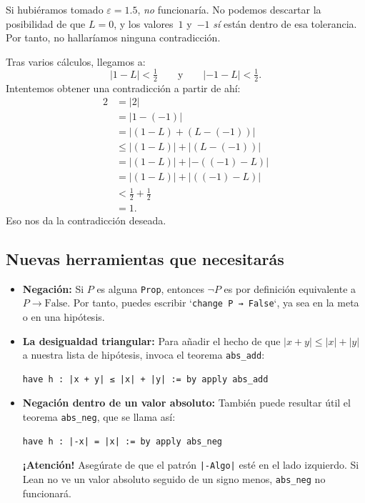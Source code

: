 \begin{nota}
  Si hubiéramos tomado $\varepsilon = 1.5$, \emph{no} funcionaría. No podemos
  descartar la posibilidad de que $L = 0$, y los valores~$1$ y~$-1$ \emph{sí}
  están dentro de esa tolerancia. Por tanto, no hallaríamos ninguna
  contradicción.
\end{nota}

Tras varios cálculos, llegamos a:
\[
  |1 - L| < \tfrac{1}{2}
  \qquad\text{y}\qquad
  |-1 - L| < \tfrac{1}{2}.
\]
Intentemos obtener una contradicción a partir de ahí:
\begin{align*}
  2 &= |2| \\
    &= |1 - (-1)| \\
    &= |(1 - L) + (L - (-1))| \\
    &\leq |(1 - L)| + |(L - (-1))| \\
    &= |(1 - L)| + |{-}((-1) - L)| \\
    &= |(1 - L)| + |((-1) - L)| \\
    & < \tfrac{1}{2} + \tfrac{1}{2} \\
    &= 1.
\end{align*}
Eso nos da la contradicción deseada.

\subsection*{Nuevas herramientas que necesitarás}

\begin{itemize}
  \item \textbf{Negación:} Si $P$ es alguna \texttt{Prop}, entonces $\neg P$
        es por definición equivalente a $P \to \text{False}$. Por tanto,
        puedes escribir `\texttt{change P → False}`, ya sea en la meta o en una
        hipótesis.

  \item \textbf{La desigualdad triangular:} Para añadir el hecho de que
        $|x + y| \leq |x| + |y|$ a nuestra lista de hipótesis, invoca el
        teorema \texttt{abs\_add}:
\begin{verbatim}
have h : |x + y| ≤ |x| + |y| := by apply abs_add
\end{verbatim}

  \item \textbf{Negación dentro de un valor absoluto:} También puede
        resultar útil el teorema \texttt{abs\_neg}, que se llama así:
\begin{verbatim}
have h : |-x| = |x| := by apply abs_neg
\end{verbatim}

  \textbf{¡Atención!} Asegúrate de que el patrón \texttt{|-Algo|} esté en el
  lado izquierdo. Si Lean no ve un valor absoluto seguido de un signo menos,
  \texttt{abs\_neg} no funcionará.
\end{itemize}

